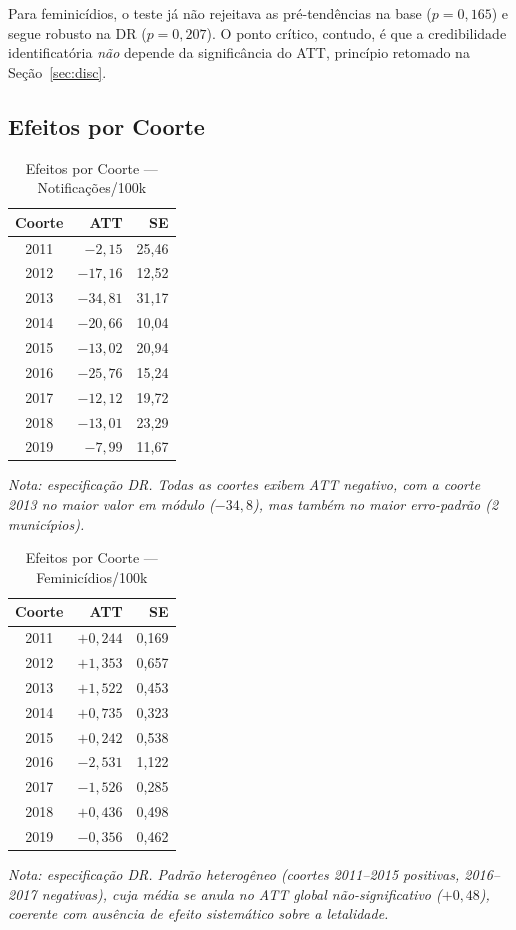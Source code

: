 \documentclass[twocolumn, 10pt]{article}
\begin{document}
Para feminicídios, o teste já não rejeitava as pré-tendências na base
($p=0{,}165$) e segue robusto na DR ($p=0{,}207$). O ponto crítico, contudo,
é que a credibilidade identificatória \textit{não} depende da significância do
ATT, princípio retomado na Seção~\ref{sec:disc}.

\subsection{Efeitos por Coorte}

\begin{table}[H]
\centering
\caption{Efeitos por Coorte — Notificações/100k}
\label{tab:coorte_notif}
\small
\begin{tabular}{@{}crr@{}}
\toprule
\textbf{Coorte} & \textbf{ATT} & \textbf{SE} \\
\midrule
2011 & $-2{,}15$  & 25,46 \\
2012 & $-17{,}16$ & 12,52 \\
2013 & $-34{,}81$ & 31,17 \\
2014 & $-20{,}66$ & 10,04 \\
2015 & $-13{,}02$ & 20,94 \\
2016 & $-25{,}76$ & 15,24 \\
2017 & $-12{,}12$ & 19,72 \\
2018 & $-13{,}01$ & 23,29 \\
2019 & $-7{,}99$  & 11,67 \\
\bottomrule
\end{tabular}
\smallskip\par
{\footnotesize\sffamily\itshape
Nota: especificação DR. Todas as coortes exibem ATT negativo, com a coorte 2013
no maior valor em módulo ($-34{,}8$), mas também no maior erro-padrão
(2 municípios).}
\end{table}

\begin{table}[H]
\centering
\caption{Efeitos por Coorte — Feminicídios/100k}
\label{tab:coorte_femin}
\small
\begin{tabular}{@{}crr@{}}
\toprule
\textbf{Coorte} & \textbf{ATT} & \textbf{SE} \\
\midrule
2011 & $+0{,}244$ & 0,169 \\
2012 & $+1{,}353$ & 0,657 \\
2013 & $+1{,}522$ & 0,453 \\
2014 & $+0{,}735$ & 0,323 \\
2015 & $+0{,}242$ & 0,538 \\
2016 & $-2{,}531$ & 1,122 \\
2017 & $-1{,}526$ & 0,285 \\
2018 & $+0{,}436$ & 0,498 \\
2019 & $-0{,}356$ & 0,462 \\
\bottomrule
\end{tabular}
\smallskip\par
{\footnotesize\sffamily\itshape
Nota: especificação DR. Padrão heterogêneo (coortes 2011--2015 positivas,
2016--2017 negativas), cuja média se anula no ATT global não-significativo
($+0{,}48$), coerente com ausência de efeito sistemático sobre a letalidade.}
\end{table}
\end{document}
